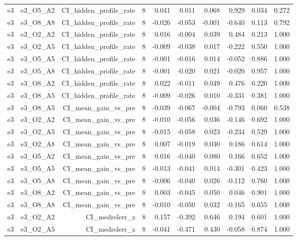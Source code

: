 \documentclass[11pt]{article}
\begin{document}
\begin{landscape}
\begin{longtable}{@{}lrrrrrrrrr@{}}
e3 & e3\_O5\_A2 & CI\_hidden\_profile\_rate & 8 & 0.041 & 0.011 & 0.068 & 0.929 & 0.034 & 0.272 \\
e3 & e3\_O8\_A8 & CI\_hidden\_profile\_rate & 8 & -0.026 & -0.053 & -0.001 & -0.640 & 0.113 & 0.792 \\
e3 & e3\_O2\_A2 & CI\_hidden\_profile\_rate & 8 & 0.016 & -0.004 & 0.039 & 0.484 & 0.213 & 1.000 \\
e3 & e3\_O2\_A5 & CI\_hidden\_profile\_rate & 8 & -0.009 & -0.038 & 0.017 & -0.222 & 0.550 & 1.000 \\
e3 & e3\_O5\_A5 & CI\_hidden\_profile\_rate & 8 & -0.001 & -0.016 & 0.014 & -0.052 & 0.886 & 1.000 \\
e3 & e3\_O5\_A8 & CI\_hidden\_profile\_rate & 8 & -0.001 & -0.020 & 0.021 & -0.020 & 0.957 & 1.000 \\
e3 & e3\_O8\_A2 & CI\_hidden\_profile\_rate & 8 & 0.022 & -0.011 & 0.049 & 0.476 & 0.220 & 1.000 \\
e3 & e3\_O8\_A5 & CI\_hidden\_profile\_rate & 8 & -0.009 & -0.026 & 0.010 & -0.331 & 0.381 & 1.000 \\
e3 & e3\_O8\_A5 & CI\_mean\_gain\_vs\_pre & 8 & -0.039 & -0.067 & -0.004 & -0.793 & 0.060 & 0.538 \\
e3 & e3\_O2\_A2 & CI\_mean\_gain\_vs\_pre & 8 & -0.010 & -0.056 & 0.036 & -0.146 & 0.692 & 1.000 \\
e3 & e3\_O2\_A5 & CI\_mean\_gain\_vs\_pre & 8 & -0.015 & -0.058 & 0.023 & -0.234 & 0.529 & 1.000 \\
e3 & e3\_O2\_A8 & CI\_mean\_gain\_vs\_pre & 8 & 0.007 & -0.019 & 0.030 & 0.186 & 0.614 & 1.000 \\
e3 & e3\_O5\_A2 & CI\_mean\_gain\_vs\_pre & 8 & 0.016 & -0.040 & 0.080 & 0.166 & 0.652 & 1.000 \\
e3 & e3\_O5\_A5 & CI\_mean\_gain\_vs\_pre & 8 & -0.013 & -0.041 & 0.014 & -0.301 & 0.423 & 1.000 \\
e3 & e3\_O5\_A8 & CI\_mean\_gain\_vs\_pre & 8 & -0.006 & -0.040 & 0.026 & -0.112 & 0.760 & 1.000 \\
e3 & e3\_O8\_A2 & CI\_mean\_gain\_vs\_pre & 8 & 0.003 & -0.045 & 0.050 & 0.046 & 0.901 & 1.000 \\
e3 & e3\_O8\_A8 & CI\_mean\_gain\_vs\_pre & 8 & -0.010 & -0.050 & 0.032 & -0.165 & 0.655 & 1.000 \\
e3 & e3\_O2\_A2 & CI\_medrelerr\_z & 8 & 0.157 & -0.392 & 0.646 & 0.194 & 0.601 & 1.000 \\
e3 & e3\_O2\_A5 & CI\_medrelerr\_z & 8 & -0.041 & -0.471 & 0.430 & -0.058 & 0.874 & 1.000 \\

\end{longtable}
\end{landscape}
\end{document}
